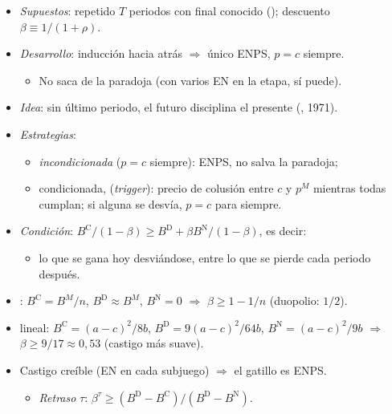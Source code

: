\documentclass{article}
\begin{document}
\begin{columnas}
\begin{itemize}
\item \emph{Supuestos}:  repetido $T$ periodos con final conocido (); descuento $\beta\equiv1/(1+\rho)$.
\item \emph{Desarrollo}: inducción hacia atrás $\Rightarrow$ único ENPS, $p=c$ siempre.
  \begin{itemize}
  \item No saca de la paradoja (con varios EN en la etapa, sí puede).
  \end{itemize}
\end{itemize}

\begin{itemize}
\item \emph{Idea}: sin último periodo, el futuro disciplina el presente (, 1971).
\item \emph{Estrategias}:
  \begin{itemize}
  \item \emph{incondicionada} ($p=c$ siempre): ENPS, no salva la paradoja;
  \item condicionada,  (\emph{trigger}): precio de colusión entre $c$ y $p^M$ mientras todas cumplan; si alguna se desvía, $p=c$ para siempre.
  \end{itemize}
\item \emph{Condición}: $B^{\mathrm C}/(1-\beta)\geq B^{\mathrm D}+\beta B^{\mathrm N}/(1-\beta)$, es decir:
  \begin{itemize}
  \item lo que se gana hoy desviándose, entre lo que se pierde cada periodo después.
  \end{itemize}
\item \emph{}: $B^{\mathrm C}=B^M/n$, $B^{\mathrm D}\approx B^M$, $B^{\mathrm N}=0$ $\Rightarrow$ $\beta\geq1-1/n$ (duopolio: $1/2$).
\item \emph{} lineal: $B^{\mathrm C}=(a-c)^2/8b$, $B^{\mathrm D}=9(a-c)^2/64b$, $B^{\mathrm N}=(a-c)^2/9b$ $\Rightarrow$ $\beta\geq9/17\approx0{,}53$ (castigo más suave).
\item Castigo creíble (EN en cada subjuego) $\Rightarrow$ el gatillo es ENPS.
  \begin{itemize}
  \item \emph{Retraso} $\tau$: $\beta^{\tau}\geq(B^{\mathrm D}-B^{\mathrm C})/(B^{\mathrm D}-B^{\mathrm N})$.

\end{itemize}
\end{itemize}
\end{columnas}
\end{document}
